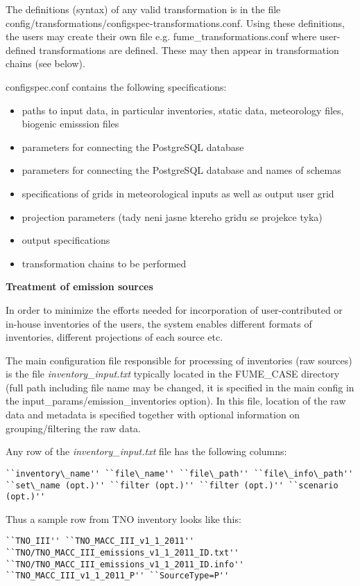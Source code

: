 \documentclass[a4paper,11pt]{article}
\begin{document}
The definitions (syntax) of any valid transformation is in the file
config/transformations/configspec-transformations.conf. Using these
definitions, the users may create their own file e.g.
fume\_transformations.conf where user-defined transformations are
defined. These may then appear in transformation chains (see below).

configspec.conf contains the following specifications:

\begin{itemize}
\item
  paths to input data, in particular inventories, static data,
  meteorology files, biogenic emisssion files
\item
  parameters for connecting the PostgreSQL database
\item
  parameters for connecting the PostgreSQL database and names of schemas
\item
  specifications of grids in meteorological inputs as well as output
  user grid
\item
  projection parameters (tady neni jasne ktereho gridu se projekce tyka)
\item
  output specifications
\item
  transformation chains to be performed
\end{itemize}

\textbf{Treatment of emission sources}

In order to minimize the efforts needed for incorporation of
user-contributed or in-house inventories of the users, the system
enables different formats of inventories, different projections of each
source etc.

The main configuration file responsible for processing of inventories
(raw sources) is the file \emph{inventory\_input.txt} typically located
in the FUME\_CASE directory (full path including file name may be
changed, it is specified in the main config in the
input\_params/emission\_inventories option). In this file, location of
the raw data and metadata is specified together with optional
information on grouping/filtering the raw data.

Any row of the \emph{inventory\_input.txt} file has the following
columns: 
\begin{verbatim}
``inventory\_name'' ``file\_name'' ``file\_path'' ``file\_info\_path''
``set\_name (opt.)'' ``filter (opt.)'' ``filter (opt.)'' ``scenario (opt.)''   
\end{verbatim}


Thus a sample row from TNO inventory looks like this:
\begin{verbatim}
``TNO_III'' ``TNO_MACC_III_v1_1_2011'' ``TNO/TNO_MACC_III_emissions_v1_1_2011_ID.txt'' ``TNO/TNO_MACC_III_emissions_v1_1_2011_ID.info''
``TNO_MACC_III_v1_1_2011_P'' ``SourceType=P''
\end{verbatim}
\end{document}
